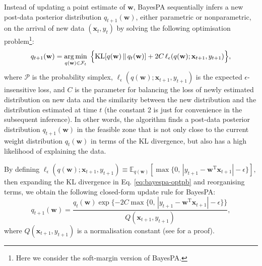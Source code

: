 Instead of updating a point estimate of $\mathbf{w}$, BayesPA sequentially infers a new post-data posterior distribution $q_{t+1}(\mathbf{w})$, either parametric or nonparametric, on the arrival of new data $(\mathbf{x}_t, y_t)$ by solving
the following optimisation problem\footnote{Here we consider the soft-margin version of BayesPA.}:
\begin{equation}
\label{eq:bayespa-optpb}
	q_{t+1}(\mathbf{w}) = \operatorname*{arg\,min}_{q(\mathbf{w}) \in \mathcal{F}_t} \; \Big\{\mathrm{KL}[q(\mathbf{w}) \, \Vert \, q_{t}(\mathbf{w})] + 2C \, \ell_{\epsilon}(q(\mathbf{w}); \mathbf{x}_{t+1}, y_{t+1})\Big\},
\end{equation}
where $\mathcal{P}$ is the probability simplex, $\ell_{\epsilon}(q(\mathbf{w}); \mathbf{x}_{t+1}, y_{t+1})$ is the expected $\epsilon$-insensitive loss, and $C$ is the parameter for balancing the loss of newly estimated distribution on new data and the similarity between the new distribution and the distribution estimated at time $t$ (the constant 2 is just for convenience in the subsequent inference). In other words, the algorithm finds a post-data posterior distribution $q_{t+1}(\mathbf{w})$ in the feasible zone that is not only close to the current weight distribution $q_{t}(\mathbf{w})$ in terms of the KL divergence, but also has a high likelihood of explaining the data.

By defining
$
	\ell_{\epsilon}(q(\mathbf{w}); \mathbf{x}_{t+1}, y_{t+1})
	\equiv \mathbb{E}_{q(\mathbf{w})}[\max\{0,\, |y_{t+1} - \mathbf{w}^\text{T}\mathbf{x}_{t+1}| - \epsilon\}],
$
then expanding the KL divergence in Eq. \eqref{eq:bayespa-optpb} and reorganising terms, we obtain the following closed-form update rule for BayesPA:
\begin{equation}
	q_{t+1}(\mathbf{w}) = \frac{q_{t}(\mathbf{w})\exp\{-2C\max\{0,\, |y_{t+1} - \mathbf{w}^\text{T}\mathbf{x}_{t+1}| - \epsilon\}\}}{Q(\mathbf{x}_{t+1}, y_{t+1})},
\end{equation}
where $Q(\mathbf{x}_{t+1}, y_{t+1})$ is a normalisation constant (see \citep[Lemma~4]{bayespa} for a proof).